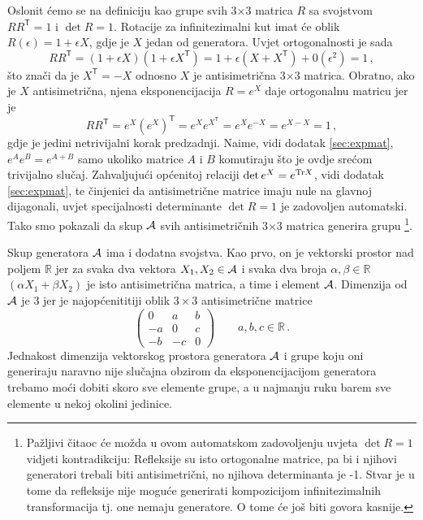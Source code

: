Oslonit ćemo se na definiciju  kao grupe svih 
3$\times$3 matrica $R$ sa svojstvom  $RR^\mathsf{T}=1$ i $\det R=1$.
Rotacije za infinitezimalni kut imat će oblik  $R(\epsilon)=1+\epsilon X$,
gdje je $X$ jedan od generatora. Uvjet ortogonalnosti je sada
\begin{equation} \label{eq:Xantisim}
 RR^\mathsf{T}=(1+\epsilon X)(1+\epsilon 
   X^\mathsf{T}) = 1+\epsilon (X+X^\mathsf{T})+0(\epsilon^2) = 1 \,,
\end{equation}
što znači da je $X^\mathsf{T}=-X$ odnosno $X$ je antisimetrična 3$\times$3 matrica.
Obratno, ako je $X$ antisimetrična, njena eksponencijacija $R = e^X$ daje ortogonalnu
matricu jer je
\begin{equation}
  R R^\mathsf{T} = e^X (e^X)^\mathsf{T} = e^X e^{X^\mathsf{T}}
  = e^X e^{-X}
  = e^{X-X} = 1 \,,
\end{equation}
gdje je jedini netrivijalni korak predzadnji. Naime, vidi dodatak \ref{sec:expmat},
$e^{A} e^{B} = e^{A+B}$ samo ukoliko matrice $A$ i $B$ komutiraju što je ovdje
srećom trivijalno slučaj.
Zahvaljujući općenitoj relaciji $\det e^{X} = e^{\textrm{\scriptsize Tr} X}$,
vidi dodatak \ref{sec:expmat}, te činjenici da antisimetrične matrice imaju
nule na glavnoj dijagonali, uvjet specijalnosti determinante $\det R = 1$ je
zadovoljen automatski.
Tako smo pokazali da skup $\mathcal{A}$ svih antisimetričnih 3$\times$3 matrica
generira grupu \footnote{Pažljivi čitaoc će možda u ovom automatskom
    zadovoljenju uvjeta $\det R =1$ vidjeti kontradikciju:
 Refleksije su isto ortogonalne matrice,
pa bi i njihovi generatori trebali biti antisimetrični, no njihova determinanta
je -1. Stvar je u tome da refleksije nije moguće generirati kompozicijom
infinitezimalnih transformacija tj. one nemaju generatore. O tome će još biti
govora kasnije.\label{fus:refleksija}
}.

Skup generatora $\mathcal{A}$ ima i dodatna svojstva. Kao prvo, on je
vektorski prostor nad poljem $\mathbb{R}$ jer za svaka dva vektora
$X_1, X_2\in\mathcal{A}$ i svaka dva broja $\alpha, \beta\in\mathbb{R}$ 
$(\alpha X_1 + \beta X_2)$ je isto antisimetrična matrica, a time i
element $\mathcal{A}$. Dimenzija od $\mathcal{A}$ je 3 jer je najopćenititiji
oblik $3\times 3$ antisimetrične matrice
\begin{equation}
    \begin{pmatrix}
        0 &  a  &  b \\
       -a &  0  &  c \\
       -b & -c  &  0
   \end{pmatrix}  \qquad   a, b, c \in \mathbb{R} \,.
\end{equation}
Jednakost dimenzija vektorskog prostora generatora $\mathcal{A}$ i grupe  koju
oni generiraju naravno nije slučajna obzirom da eksponencijacijom
generatora trebamo moći dobiti skoro sve elemente grupe, a u najmanju ruku
barem sve elemente u nekoj okolini jedinice.

